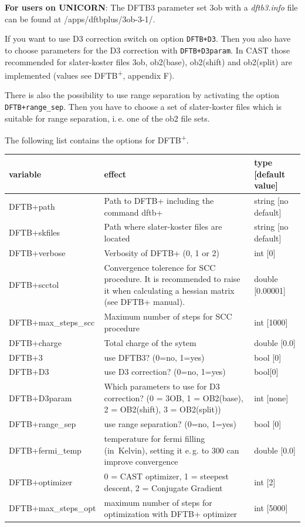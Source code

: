 \documentclass[10pt,a4paper]{article} %
\begin{document}
\textbf{For users on UNICORN}: The DFTB3 parameter set 3ob with a \textit{dftb3.info} file can be found at /apps/dftbplus/3ob-3-1/.

If you want to use D3 correction switch on option \texttt{DFTB+D3}. Then you also have to choose parameters for the D3 correction with \texttt{DFTB+D3param}. In CAST those recommended for slater-koster files 3ob, ob2(base), ob2(shift) and ob2(split) are implemented (values see DFTB\textsuperscript{+}, appendix F).

There is also the possibility to use range separation by activating the option \texttt{DFTB+range\_sep}. Then you have to choose a set of slater-koster files which is suitable for range separation, i.\,e. one of the ob2 file sets.

The following list contains the options for DFTB\textsuperscript{+}. 

		\begin{longtable}{|p{3.5cm}|p{5cm}|p{3cm}|}
		variable & effect & type [default value] \\
		\hline
			DFTB+path  & Path to DFTB+ including the command dftb+ & string [no default]\\
			DFTB+skfiles  & Path where slater-koster files are located & string [no default]\\
			DFTB+verbose & Verbosity of DFTB+ (0, 1 or 2) & int [0]\\
			DFTB+scctol & Convergence tolerence for SCC procedure. It is recommended to raise it when calculating a hessian matrix (see DFTB+ manual). & double [0.00001]\\
            DFTB+max\_steps\_scc & Maximum number of steps for SCC procedure & int [1000]\\
			DFTB+charge & Total charge of the sytem & double [0.0] \\
			DFTB+3 & use DFTB3? (0=no, 1=yes) & bool [0] \\
			DFTB+D3 & use D3 correction? (0=no, 1=yes) & bool[0] \\
			DFTB+D3param & Which parameters to use for D3 correction? (0 = 3OB, 1 = OB2(base), 2 = OB2(shift), 3 = OB2(split)) & int [none] \\
			DFTB+range\_sep & use range separation? (0=no, 1=yes) & bool [0] \\
			DFTB+fermi\_temp & temperature for fermi filling \mbox{(in Kelvin)}, setting it e.\,g. to 300 can improve convergence & double [0.0] \\
			DFTB+optimizer & 0 = CAST optimizer, 1 = steepest descent, 2 = Conjugate Gradient & int [2] \\
			DFTB+max\_steps\_opt & maximum number of steps for optimization with DFTB+ optimizer & int [5000] \\
		\end{longtable}
		
\end{document}
